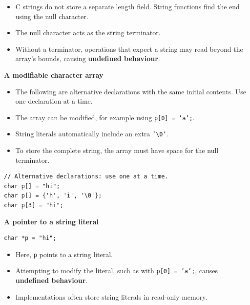 \documentclass[11pt,a4paper]{article}
\begin{document}
\begin{itemize}
    \item C strings do not store a separate length field.
          String functions find the end using the null character.
    \item The null character acts as the string terminator.
    \item Without a terminator, operations that expect a string
          may read beyond the array's bounds, causing
          \textbf{undefined behaviour}.
\end{itemize}


\textbf{A modifiable character array}

\begin{itemize}
    \item The following are alternative declarations with the same
          initial contents. Use one declaration at a time.
    \item The array can be modified, for example using
          \texttt{p[0] = 'a';}.
    \item String literals automatically include an extra
          \texttt{'\textbackslash0'}.
    \item To store the complete string, the array must have space
          for the null terminator.
\end{itemize}

\begin{lstlisting}[style=cscode]
// Alternative declarations: use one at a time.
char p[] = "hi";
char p[] = {'h', 'i', '\0'};
char p[3] = "hi";
\end{lstlisting}

\textbf{A pointer to a string literal}

\begin{lstlisting}[style=cscode]
char *p = "hi";
\end{lstlisting}

\begin{itemize}
    \item Here, \texttt{p} points to a string literal.
    \item Attempting to modify the literal, such as with
          \texttt{p[0] = 'a';}, causes
          \textbf{undefined behaviour}.
    \item Implementations often store string literals in
          read-only memory.
\end{itemize}
\end{document}
